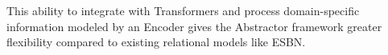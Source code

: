 This ability to integrate with Transformers and process domain-specific information modeled by an Encoder gives the Abstractor framework greater flexibility compared to existing relational models like ESBN.


%
%
%
%
%

